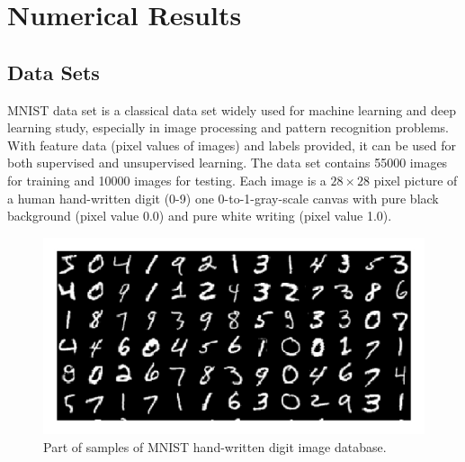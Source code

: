 \documentclass[12pt]{report} %
\begin{document}
\chapter{Numerical Results}
\section{Data Sets}
MNIST data set\cite{MNIST} is a classical data set widely used for machine learning and deep learning study, especially in image processing and pattern recognition problems. With feature data (pixel values of images) and labels provided, it can be used for both supervised and unsupervised learning. The data set contains 55000 images for training and 10000 images for testing. Each image is a $28 \times 28$ pixel picture of a human hand-written digit (0-9) one 0-to-1-gray-scale canvas with pure black background (pixel value 0.0) and pure white writing (pixel value 1.0).
\begin{figure}[H]
	\centering
	\includegraphics[scale=2.0]{pictures/MNIST.png}
	\caption{Part of samples of MNIST hand-written digit image database\cite{MNISTPIC}.}
	\label{fig:1}
\end{figure}
\end{document}
